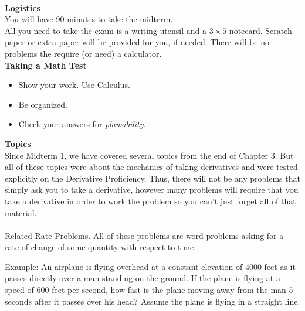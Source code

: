 \documentclass[11pt,fleqn]{article}
\begin{document}
\renewcommand{\headrulewidth}{0pt}
\newcommand{\blank}[1]{\rule{#1}{0.75pt}}
\newcommand{\bc}{\begin{center}}
\newcommand{\ec}{\end{center}}
\renewcommand{\d}{\displaystyle}

\vspace*{-0.7in}

\begin{center}
  \large
  \\
\end{center}
\noindent\textbf{Logistics}\\

You will have 90 minutes to take the midterm. \\

All you need to take the exam is a writing utensil and a $3 \times 5$ notecard. Scratch paper or extra paper will be provided for you, if needed. There will be no problems the require (or need) a calculator. \\

\noindent\textbf{Taking a Math Test}

\begin{itemize}
\item Show your work. Use Calculus.
\item Be organized.
\item Check your answers for \emph{plausibility}.
\end{itemize}


\noindent\textbf{Topics}\\

\noindent Since Midterm 1, we have covered several topics from the end of Chapter 3. But all of these topics were about the mechanics of taking derivatives and were tested explicitly on the Derivative Proficiency. Thus, there will not be any problems that simply ask you to take a derivative, however many problems will require that you take a derivative in order to work the problem so you can't just forget all of that material.\\ 

\noindent {}\\
Related Rate Problems. All of these problems are word problems asking for a rate of change of some quantity with respect to time. 

Example:  An airplane is flying overhead at a constant elevation of 4000 feet as it passes directly over a man standing on the ground. If the plane is flying at a speed of 600 feet per second, how fast is the plane moving away from the man 5 seconds after it passes over his head? Assume the plane is flying in a straight line.\\
\end{document}
